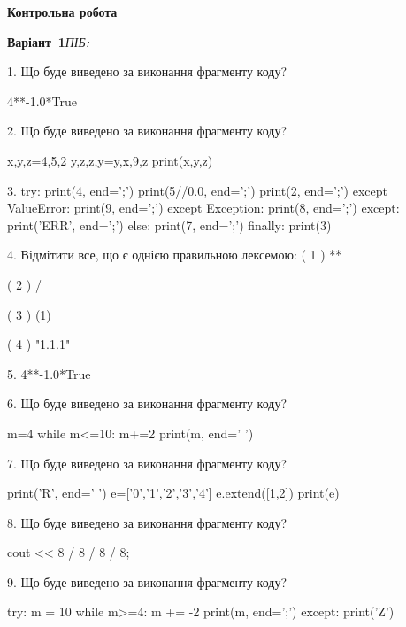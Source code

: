 \documentclass[11pt]{article}
\begin{document}
{\large\textbf{Контрольна робота}}

\textbf{Варіант \No\,1}\hfill \textit{ПІБ:}\,\underline{\hspace{60mm}}
\vspace{4mm}

1. Що буде виведено за виконання фрагменту коду?

4**-1.0*True


2. Що буде виведено за виконання фрагменту коду?

x,y,z=4,5,2
y,z,z,y=y,x,9,z
print(x,y,z)


3. 
try:
    print(4, end=';')
    print(5//0.0, end=';')
    print(2, end=';')
except ValueError:
    print(9, end=';')
except Exception:
    print(8, end=';')
except:
    print('ERR', end=';')
else:
    print(7, end=';')
finally:
    print(3)


4. %
Відмітити все, що є однією правильною лексемою:
( 1 ) **

( 2 ) /

( 3 ) (1)

( 4 ) "1.1.1"


5. 
4**-1.0*True

6. Що буде виведено за виконання фрагменту коду?

m=4
while m<=10:
    m+=2
print(m, end=' ')



7. Що буде виведено за виконання фрагменту коду?

print('R', end=' ')
e=['0','1','2','3','4']
e.extend([1,2])
print(e)



8. Що буде виведено за виконання фрагменту коду?

cout << 8 / 8 / 8 / 8;


9. Що буде виведено за виконання фрагменту коду?

try:
    m = 10
    while m>=4:
        m += -2
    print(m, end=';')
except:
    print('Z')


\end{document}
